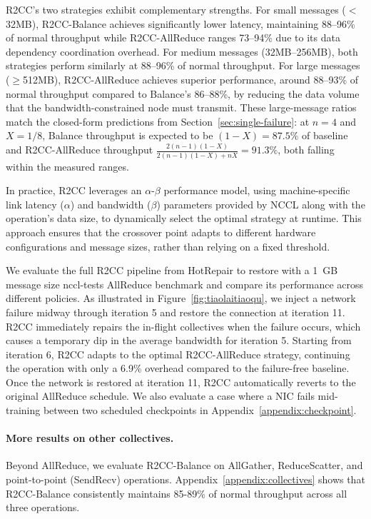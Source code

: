 \documentclass[letterpaper,twocolumn,10pt]{article}
\begin{document}
R2CC's two strategies exhibit complementary strengths. For small messages ($<$32MB), R2CC-Balance achieves significantly lower latency, maintaining 88--96\% of normal throughput while R2CC-AllReduce ranges 73--94\% due to its data dependency coordination overhead. For medium messages (32MB--256MB), both strategies perform similarly at 88--96\% of normal throughput. For large messages ($\geq$512MB), R2CC-AllReduce achieves superior performance, around 88--93\% of normal throughput compared to Balance's 86--88\%, by reducing the data volume that the bandwidth-constrained node must transmit. These large-message ratios match the closed-form predictions from Section~\ref{sec:single-failure}: at $n = 4$ and $X = 1/8$, Balance throughput is expected to be $(1-X) = 87.5\%$ of baseline and R2CC-AllReduce throughput $\frac{2(n-1)(1-X)}{2(n-1)(1-X)+nX} = 91.3\%$, both falling within the measured ranges.

In practice, R2CC leverages an $\alpha$-$\beta$ performance model, using machine-specific link latency ($\alpha$) and bandwidth ($\beta$) parameters provided by NCCL along with the operation's data size, to dynamically select the optimal strategy at runtime. This approach ensures that the crossover point adapts to different hardware configurations and message sizes, rather than relying on a fixed threshold.

We evaluate the full R2CC pipeline from HotRepair to restore with a 1~GB message size nccl-tests AllReduce benchmark and compare its performance across different policies. As illustrated in Figure~\ref{fig:tiaolaitiaoqu}, we inject a network failure midway through iteration 5 and restore the connection at iteration 11. R2CC immediately repairs the in-flight collectives when the failure occurs, which causes a temporary dip in the average bandwidth for iteration 5. Starting from iteration 6, R2CC adapts to the optimal R2CC-AllReduce strategy, continuing the operation with only a 6.9\% overhead compared to the failure-free baseline. Once the network is restored at iteration 11, R2CC automatically reverts to the original AllReduce schedule. We also evaluate a case where a NIC fails mid-training between two scheduled checkpoints in Appendix~\ref{appendix:checkpoint}.

\paragraph{More results on other collectives.} Beyond AllReduce, we evaluate R2CC-Balance on AllGather, ReduceScatter, and point-to-point (SendRecv) operations. Appendix~\ref{appendix:collectives} shows that R2CC-Balance consistently maintains 85-89\% of normal throughput across all three operations.
\end{document}

